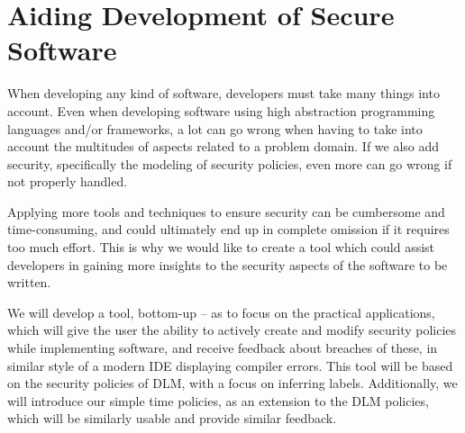 
\section{Aiding Development of Secure Software}
When developing any kind of software, developers must take many things into account.
Even when developing software using high abstraction programming languages and/or frameworks, a lot can go wrong when having to take into account the multitudes of aspects related to a problem domain.
If we also add security, specifically the modeling of security policies, even more can go wrong if not properly handled.

Applying more tools and techniques to ensure security can be cumbersome and time-consuming, and could ultimately end up in complete omission if it requires too much effort.
This is why we would like to create a tool which could assist developers in gaining more insights to the security aspects of the software to be written.

We will develop a tool, bottom-up -- as to focus on the practical applications, which will give the user the ability to actively create and modify security policies while implementing software, and receive feedback about breaches of these, in similar style of a modern IDE displaying compiler errors.
This tool will be based on the security policies of DLM, with a focus on inferring labels.
Additionally, we will introduce our simple time policies, as an extension to the DLM policies, which will be similarly usable and provide similar feedback.
